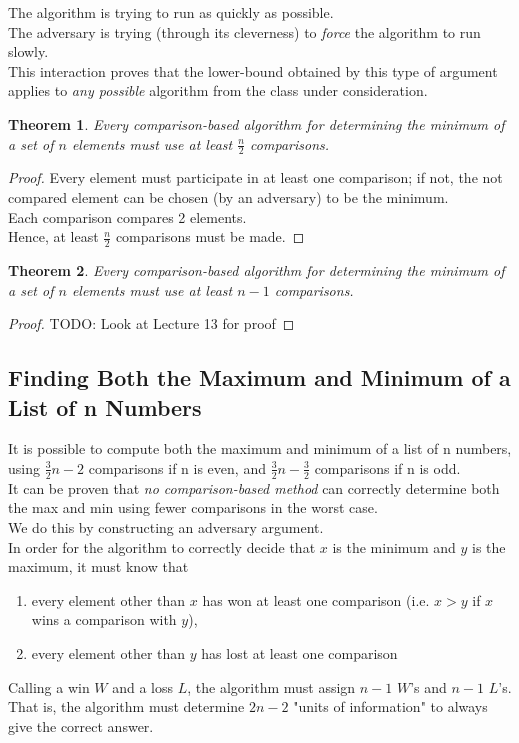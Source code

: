 \documentclass[12pt]{article}
\theoremstyle{plain}
\newtheorem{theorem}{Theorem}[subsection]
\theoremstyle{definition}
\begin{document}
The algorithm is trying to run as quickly as possible. \\
The adversary is trying (through its cleverness) to \emph{force} the algorithm to run slowly. \\
This interaction proves that the lower-bound obtained by this type of argument applies to \emph{any possible} algorithm from the class under consideration. \\

\begin{theorem}
Every comparison-based algorithm for determining the minimum of a set of $n$ elements must use at least $\frac{n}{2}$ comparisons.
\end{theorem}
\begin{proof}
Every element must participate in at least one comparison;
if not, the not compared element can be chosen (by an adversary) to be the minimum. \\
Each comparison compares 2 elements. \\
Hence, at least $\frac{n}{2}$ comparisons must be made.
\end{proof}

\begin{theorem}
Every comparison-based algorithm for determining the minimum of a set of $n$ elements must use at least $n-1$ comparisons.
\end{theorem}
\begin{proof}
TODO: Look at Lecture 13 for proof
\end{proof}

\subsection{Finding Both the Maximum and Minimum of a List of n Numbers}
It is possible to compute both the maximum and minimum of a list of n numbers, using $\frac{3}{2}n - 2$ comparisons if n is even, and $\frac{3}{2}n - \frac{3}{2}$ comparisons if n is odd. \\
It can be proven that \emph{no comparison-based method} can correctly determine both the max and min using fewer comparisons in the worst case. \\

We do this by constructing an adversary argument. \\

In order for the algorithm to correctly decide that $x$ is the minimum and $y$ is the maximum, it must know that
\begin{enumerate}
  \item every element other than $x$ has won at least one comparison (i.e. $x > y$ if $x$ wins a comparison with $y$),
  \item every element other than $y$ has lost at least one comparison
\end{enumerate}
Calling a win $W$ and a loss $L$, the algorithm must assign $n-1$ $W$'s and $n-1$ $L$'s.
That is, the algorithm must determine $2n-2$ "units of information" to always give the correct answer. \\
\end{document}
